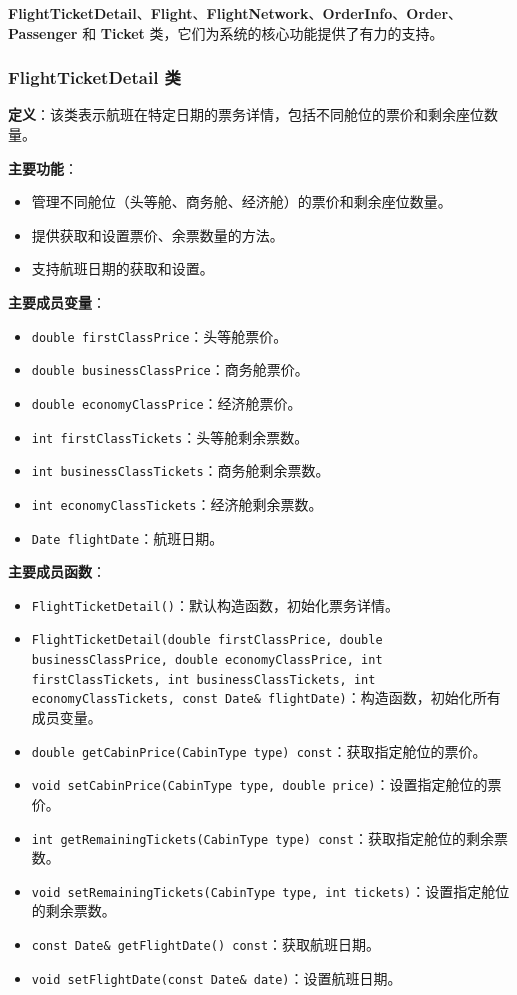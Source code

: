 \documentclass[UTF8, a4paper,12pt]{ctexart}
\begin{document}
\textbf{FlightTicketDetail}、\textbf{Flight}、\textbf{FlightNetwork}、\textbf{OrderInfo}、\textbf{Order}、\textbf{Passenger} 和 \textbf{Ticket} 类，它们为系统的核心功能提供了有力的支持。

\subsubsection{FlightTicketDetail 类}

\textbf{定义}：该类表示航班在特定日期的票务详情，包括不同舱位的票价和剩余座位数量。

\textbf{主要功能}：

\begin{itemize}
    \item 管理不同舱位（头等舱、商务舱、经济舱）的票价和剩余座位数量。
    \item 提供获取和设置票价、余票数量的方法。
    \item 支持航班日期的获取和设置。
\end{itemize}

\textbf{主要成员变量}：

\begin{itemize}
    \item \texttt{double firstClassPrice}：头等舱票价。
    \item \texttt{double businessClassPrice}：商务舱票价。
    \item \texttt{double economyClassPrice}：经济舱票价。
    \item \texttt{int firstClassTickets}：头等舱剩余票数。
    \item \texttt{int businessClassTickets}：商务舱剩余票数。
    \item \texttt{int economyClassTickets}：经济舱剩余票数。
    \item \texttt{Date flightDate}：航班日期。
\end{itemize}

\textbf{主要成员函数}：

\begin{itemize}
    \item \texttt{FlightTicketDetail()}：默认构造函数，初始化票务详情。
    \item \texttt{FlightTicketDetail(double firstClassPrice, double businessClassPrice, double economyClassPrice, int firstClassTickets, int businessClassTickets, int economyClassTickets, const Date\& flightDate)}：构造函数，初始化所有成员变量。
    \item \texttt{double getCabinPrice(CabinType type) const}：获取指定舱位的票价。
    \item \texttt{void setCabinPrice(CabinType type, double price)}：设置指定舱位的票价。
    \item \texttt{int getRemainingTickets(CabinType type) const}：获取指定舱位的剩余票数。
    \item \texttt{void setRemainingTickets(CabinType type, int tickets)}：设置指定舱位的剩余票数。
    \item \texttt{const Date\& getFlightDate() const}：获取航班日期。
    \item \texttt{void setFlightDate(const Date\& date)}：设置航班日期。
\end{itemize}
\end{document}
